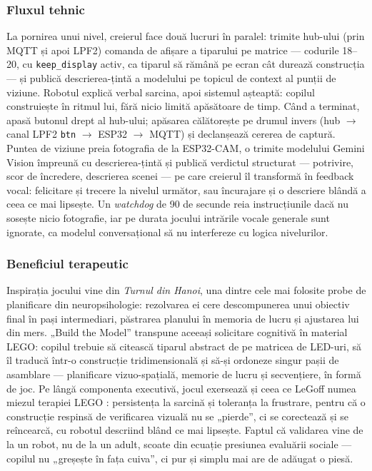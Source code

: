 \subsubsection*{Fluxul tehnic}
La pornirea unui nivel, creierul face două lucruri în paralel: trimite hub-ului (prin MQTT și apoi LPF2) comanda de afișare a tiparului pe matrice — codurile 18--20, cu \texttt{keep\_display} activ, ca tiparul să rămână pe ecran cât durează construcția — și publică descrierea-țintă a modelului pe topicul de context al punții de viziune. Robotul explică verbal sarcina, apoi sistemul așteaptă: copilul construiește în ritmul lui, fără nicio limită apăsătoare de timp. Când a terminat, apasă butonul drept al hub-ului; apăsarea călătorește pe drumul invers (hub $\rightarrow$ canal LPF2 \texttt{btn} $\rightarrow$ ESP32 $\rightarrow$ MQTT) și declanșează cererea de captură. Puntea de viziune preia fotografia de la ESP32-CAM, o trimite modelului Gemini Vision împreună cu descrierea-țintă și publică verdictul structurat — potrivire, scor de încredere, descrierea scenei — pe care creierul îl transformă în feedback vocal: felicitare și trecere la nivelul următor, sau încurajare și o descriere blândă a ceea ce mai lipsește. Un \emph{watchdog} de 90 de secunde reia instrucțiunile dacă nu sosește nicio fotografie, iar pe durata jocului intrările vocale generale sunt ignorate, ca modelul conversațional să nu interfereze cu logica nivelurilor.

\subsubsection*{Beneficiul terapeutic}
Inspirația jocului vine din \emph{Turnul din Hanoi}, una dintre cele mai folosite probe de planificare din neuropsihologie: rezolvarea ei cere descompunerea unui obiectiv final în pași intermediari, păstrarea planului în memoria de lucru și ajustarea lui din mers. „Build the Model” transpune aceeași solicitare cognitivă în material LEGO: copilul trebuie să citească tiparul abstract de pe matricea de LED-uri, să îl traducă într-o construcție tridimensională și să-și ordoneze singur pașii de asamblare — planificare vizuo-spațială, memorie de lucru și secvențiere, în formă de joc. Pe lângă componenta executivă, jocul exersează și ceea ce LeGoff numea miezul terapiei LEGO \cite{legoff2004}: persistența la sarcină și toleranța la frustrare, pentru că o construcție respinsă de verificarea vizuală nu se „pierde”, ci se corectează și se reîncearcă, cu robotul descriind blând ce mai lipsește. Faptul că validarea vine de la un robot, nu de la un adult, scoate din ecuație presiunea evaluării sociale — copilul nu „greșește în fața cuiva”, ci pur și simplu mai are de adăugat o piesă.

